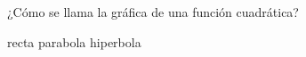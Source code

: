 
\question ¿Cómo se llama la gráfica de una función cuadrática?

  \begin{oneparchoices}
    \choice recta
    \CorrectChoice parabola
    \choice hiperbola
  \end{oneparchoices}
